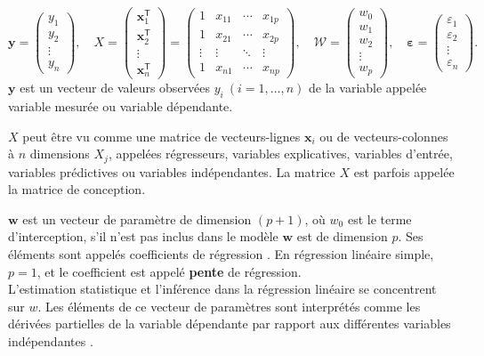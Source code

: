 		$
		\mathbf{y} ={\begin{pmatrix}y_{1}\\y_{2}\\\vdots \\y_{n}\end{pmatrix}},\quad
		{\displaystyle 
			X={
				\begin{pmatrix}
					\mathbf {x} _{1}^{\mathsf {T}}\\
					\mathbf {x} _{2}^{\mathsf {T}}\\
					\vdots \\
					\mathbf {x} _{n}^{\mathsf {T}}
				\end{pmatrix}}={
				\begin{pmatrix}
					1&x_{11}&\cdots &x_{1p}\\
					1&x_{21} &\cdots &x_{2p}\\
					\vdots &\vdots &\ddots &\vdots \\
					1&x_{n1}&\cdots &x_{np}
				\end{pmatrix}},} \quad
		{\displaystyle {\boldsymbol {\mathcal{W}}}={
				\begin{pmatrix}
					w _{0}\\
					w _{1}\\
					w _{2}\\
					\vdots \\
					w _{p}
				\end{pmatrix}},\quad 
		{\boldsymbol {\varepsilon }}={
			\begin{pmatrix}\varepsilon _{1}\\
				\varepsilon _{2}\\
				\vdots \\
				\varepsilon _{ n}
			\end{pmatrix}}.}$ \\
	
		$\mathbf{y}$ est un vecteur de valeurs observées ${\displaystyle y_{i}\ (i=1,\ldots ,n)}$ de la variable appelée variable mesurée ou variable dépendante.
		
		$X$ peut être vu comme une matrice de vecteurs-lignes $\mathbf {x} _{i}$ ou de vecteurs-colonnes à $n$ dimensions $X_{j}$, appelées régresseurs, variables explicatives, variables d'entrée, variables prédictives ou variables indépendantes. La matrice $X$ est parfois appelée la matrice de conception. 
		
		${\boldsymbol {w}}$ est un vecteur de paramètre de dimension $(p+1)$, où $w _{0}$ est le terme d'interception, s'il n'est pas inclus dans le modèle ${\boldsymbol {w}}$ est de dimension $p$. Ses éléments sont appelés coefficients de régression \cite{antoine2018apprentissage}. 
		En régression linéaire simple, $p = 1$, et le coefficient est appelé \textbf{pente} de régression.\\
		L'estimation statistique et l'inférence dans la régression linéaire se concentrent sur $w$. Les éléments de ce vecteur de paramètres sont interprétés comme les dérivées partielles de la variable dépendante par rapport aux différentes variables indépendantes \cite{darlington2016regression}.
		
